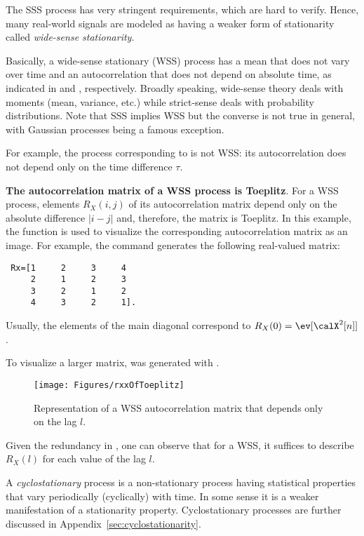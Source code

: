 The SSS process has very stringent requirements, which are hard to verify. Hence, many real-world signals are modeled as having a weaker form of stationarity called \emph{wide-sense stationarity}. %

Basically, a wide-sense stationary (WSS) process has a mean that does not vary over time and an autocorrelation that does not depend on absolute time, as indicated in  and , respectively. Broadly speaking, wide-sense theory deals with moments (mean, variance, etc.) while strict-sense deals with probability distributions. Note that SSS implies WSS but the converse is not true in general, with Gaussian processes being a famous exception.

For example, the process corresponding to  is not WSS: its autocorrelation does not depend only on the time difference $\tau$. 

\bExample \textbf{The autocorrelation matrix of a WSS process is Toeplitz}.
For a WSS process, elements $R_X(i,j)$ of its autocorrelation matrix depend only on the
absolute difference $|i-j|$ and, therefore, the matrix is Toeplitz.
In this example, the function  is used to visualize the corresponding
autocorrelation matrix as an image. For example, 
the command  generates the following real-valued matrix:
\begin{verbatim}
 Rx=[1     2     3     4
     2     1     2     3
     3     2     1     2
     4     3     2     1].
\end{verbatim}
Usually, the elements of the main diagonal correspond to $R_X(0) = \ev[\calX^2[n]]$.

To visualize a larger matrix,  was generated with .

\begin{figure}[htbp]
\centering
\texttt{[image: Figures/rxxOfToeplitz]}
\caption{Representation of a WSS autocorrelation matrix that depends only on the lag $l$.\label{fig:rxxOfToeplitz}}
\end{figure}

Given the redundancy in , one can observe that for a WSS, it
suffices to describe $R_X(l)$ for each value of the lag $l$.
\eExample


A \emph{cyclostationary} process is a non-stationary process having statistical properties that vary periodically (cyclically) with time. In some sense it is a weaker manifestation of a stationarity property.
Cyclostationary processes are further discussed in Appendix~\ref{sec:cyclostationarity}.

